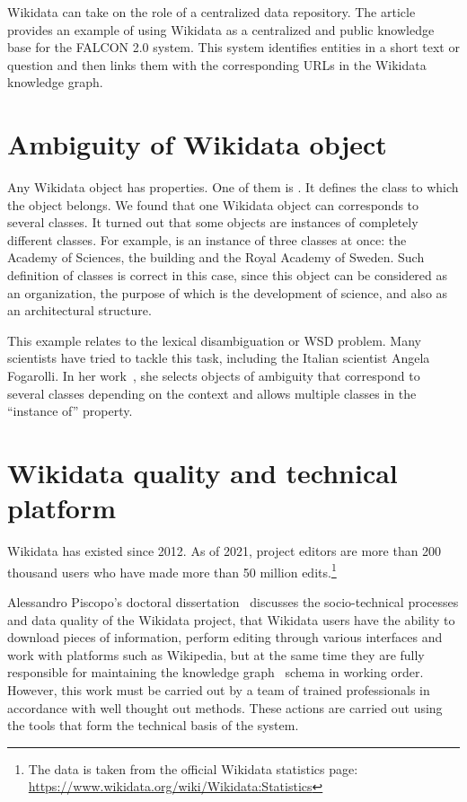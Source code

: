 Wikidata can take on the role of a centralized data repository. The article~ provides an example of using Wikidata as a centralized and public knowledge base for the FALCON 2.0 system. This system identifies entities in a short text or question and then links them with the corresponding URLs in the Wikidata knowledge graph.

\section{Ambiguity of Wikidata object}
Any Wikidata object has properties. One of them is . It defines the class to which the object belongs. 
We found that one Wikidata object can corresponds to several classes. 
It turned out that some objects are instances of completely different classes. For example,  is an instance of three classes at once: the Academy of Sciences, the building and the Royal Academy of Sweden. Such definition of classes is correct in this case, since this object can be considered as an organization, the purpose of which is the development of science, and also as an architectural structure.

This example relates to the lexical disambiguation or WSD problem. Many scientists have tried to tackle this task, including the Italian scientist Angela Fogarolli. In her work~, she selects objects of ambiguity that correspond to several classes depending on the context and allows multiple classes in the ``instance of'' property.

\section{Wikidata quality and technical platform}
Wikidata has existed since 2012. As of 2021, project editors are more than 200 thousand users who have made more than 50 million edits.\footnote{The data is taken from the official Wikidata statistics page: \href{https://www.wikidata.org/wiki/Wikidata:Statistics}{https://www.wikidata.org/wiki/Wikidata:Statistics}}

Alessandro Piscopo's doctoral dissertation~ discusses the socio-technical processes and data quality of the Wikidata project, that Wikidata users have the ability to download pieces of information, perform editing through various interfaces and work with platforms such as Wikipedia, but at the same time they are fully responsible for maintaining the knowledge graph~ schema in working order. However, this work must be carried out by a team of trained professionals in accordance with well thought out methods. These actions are carried out using the tools that form the technical basis of the system.

